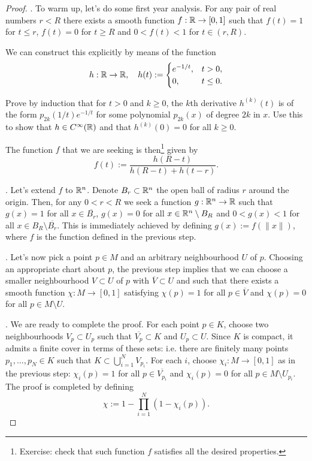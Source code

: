 \begin{proof}
  .
  To warm up, let's do some first year analysis.
  For any pair of real numbers $r < R$ there exists a smooth function $f: \mathbb{R} \to [0,1]$ such that $f(t) = 1$ for $t \leq r$, $f(t) = 0$ for $t \geq R$ and $0<f(t)<1$ for $t\in(r,R)$.

  We can construct this explicitly by means of the function
  \begin{equation}
    h:\mathbb{R}\to\mathbb{R}, \quad h(t):= \begin{cases}
      e^{-1/t}, & t>0,      \\
      0,        & t \leq 0.
    \end{cases}
  \end{equation}

  \begin{exercise}
    Prove by induction that for $t>0$ and $k\geq 0$, the $k$th derivative $h^{(k)}(t)$ is of the form $p_{2k}(1/t)e^{-1/t}$ for some polynomial $p_{2k}(x)$ of degree $2k$ in $x$.
    Use this to show that $h\in C^\infty(\mathbb{R})$ and that $h^{(k)}(0) = 0$ for all $k\geq 0$.
  \end{exercise}

  The function $f$ that we are seeking is then\footnote{Exercise: check that such function $f$ satisfies all the desired properties.} given by
  \begin{equation}
    f(t) := \frac{h(R-t)}{h(R-t) + h(t-r)}.
  \end{equation}

  .
  Let's extend $f$ to $\mathbb{R}^n$.
  Denote $B_r \subset \mathbb{R}^n$ the open ball of radius $r$ around the origin.
  Then, for any $0 < r < R$ we seek a function $g:\mathbb{R}^n\to\mathbb{R}$ such that $g(x) = 1$ for all $x\in \overline{B_r}$, $g(x) = 0$ for all $x\in \mathbb{R}^n\setminus B_R$ and $0< g(x)< 1$ for all $x\in B_R\setminus\overline{B_r}$.
  This is immediately achieved by defining $g(x) := f(\|x\|)$, where $f$ is the function defined in the previous step.

  .
  Let's now pick a point $p\in M$ and an arbitrary neighbourhood $U$ of $p$. Choosing an appropriate chart about $p$, the previous step implies that we can choose a smaller neighbourhood $V\subset U$ of $p$ with $\overline V\subset U$ and such that there exists a smooth function $\chi: M \to [0,1]$ satisfying $\chi(p) = 1$ for all $p\in\overline{V}$ and $\chi(p) = 0$ for all $p\in M\setminus U$.

  .
  We are ready to complete the proof.
  For each point $p\in K$, choose two neighbourhoods $V_p \subset U_p$ such that $\overline{V_p}\subset K$ and $U_p \subset U$.
  Since $K$ is compact, it admits a finite cover in terms of these sets: i.e. there are finitely many points $p_1, \ldots, p_N \in K$ such that $K \subset \bigcup_{i=1}^N V_{p_i}$.
  For each $i$, choose $\chi_i: M \to [0,1]$ as in the previous step: $\chi_i(p) = 1$ for all $p\in\overline{V_{p_i}}$ and $\chi_i(p) = 0$ for all $p\in M\setminus U_{p_i}$.
  The proof is completed by defining
  \begin{equation}
    \chi := 1 - \prod_{i=1}^N(1 - \chi_i(p)).
  \end{equation}
\end{proof}

